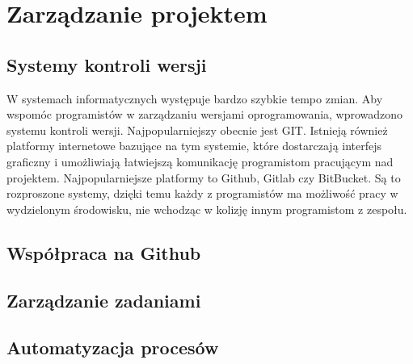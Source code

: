 \chapter{Zarządzanie projektem}

\section{Systemy kontroli wersji}
W systemach informatycznych występuje bardzo szybkie tempo zmian. Aby wspomóc programistów w zarządzaniu wersjami oprogramowania, wprowadzono systemu kontroli wersji. Najpopularniejszy obecnie jest GIT. Istnieją również platformy internetowe bazujące na tym systemie, które dostarczają interfejs graficzny i umożliwiają łatwiejszą komunikację programistom pracującym nad projektem. Najpopularniejsze platformy to Github, Gitlab czy BitBucket. Są to rozproszone systemy, dzięki temu każdy z programistów ma możliwość pracy w wydzielonym środowisku, nie wchodząc w kolizję innym programistom z zespołu.

\section{Współpraca na Github}

\section{Zarządzanie zadaniami}

\section{Automatyzacja procesów}
